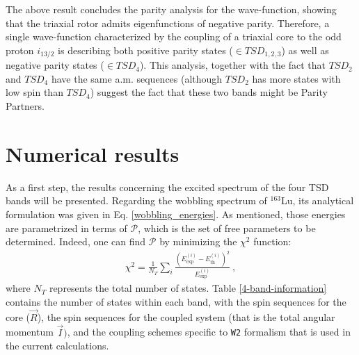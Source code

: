 \documentclass[myclassdoc,debug]{rjparticle}
\begin{document}
The above result concludes the parity analysis for the wave-function, showing that the triaxial rotor admits eigenfunctions of negative parity. Therefore, a single wave-function characterized by the coupling of a triaxial core to the odd proton $i_{13/2}$ is describing both positive parity states ($\in TSD_{1,2,3}$) as well as negative parity states ($\in TSD_4$). This analysis, together with the fact that $TSD_2$ and $TSD_4$ have the same a.m. sequences (although $TSD_2$ has more states with low spin than $TSD_4$) suggest the fact that these two bands might be Parity Partners.


\section{Numerical results}
\label{section-results}

As a first step, the results concerning the excited spectrum of the four TSD bands will be presented. Regarding the wobbling spectrum of $^{163}$Lu, its analytical formulation was given in Eq. \ref{wobbling_energies}. As mentioned, those energies are parametrized in terms of $\mathcal{P}$, which is the set of free parameters to be determined. Indeed, one can find $\mathcal{P}$ by minimizing the $\chi^2$ function:
\begin{align}
    \chi^2=\frac{1}{N_T}\sum_{i}\frac{(E^{(i)}_\text{exp}-E^{(i)}_\text{th})^2}{E^{(i)}_\text{exp}}\ ,
    \label{chi-square}
\end{align}
where $N_T$ represents the total number of states. Table \ref{4-band-information} contains the number of states within each band, with the spin sequences for the core ($\vec{R}$), the spin sequences for the coupled system (that is the total angular momentum $\vec{I})$, and the coupling schemes specific to \texttt{W2} formalism that is used in the current calculations. 
\end{document}
